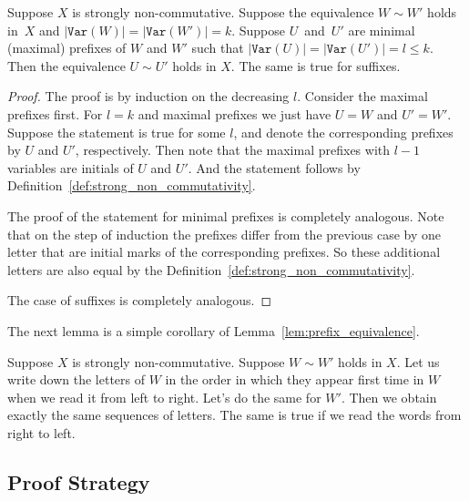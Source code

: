 \documentclass[review,onefignum,onetabnum]{siamart190516}
\newcommand{\var}{\texttt{Var}}
\begin{document}
\begin{lemma} \label{lem:prefix_equivalence}
Suppose $X$ is strongly non-commutative. Suppose the equivalence $W \sim W'$
holds in~$X$ and $|\var(W)|=|\var(W')|=k$. Suppose $U$~and~$U'$ are minimal
(maximal) prefixes of $W$ and $W'$ such that $|\var(U)| = |\var(U')| = l\leq k$.
Then the equivalence $U \sim U'$ holds in $X$. The same is true for suffixes.
\end{lemma}

\begin{proof}
The proof is by induction on the decreasing $l$. Consider the maximal prefixes
first. For $l=k$ and maximal prefixes we just have $U=W$ and $U'=W'$. Suppose
the statement is true for some $l$, and denote the corresponding prefixes by $U$
and $U'$, respectively. Then note that the maximal prefixes with $l-1$ variables
are initials of $U$ and $U'$. And the statement follows by
Definition~\ref{def:strong_non_commutativity}.

The proof of the statement for minimal prefixes is completely analogous. Note
that on the step of induction the prefixes differ from the previous case by one
letter that are initial marks of the corresponding prefixes. So these additional
letters are also equal by the Definition~\ref{def:strong_non_commutativity}.

The case of suffixes is completely analogous.
\end{proof}

The next lemma is a simple corollary of Lemma~\ref{lem:prefix_equivalence}.
\begin{lemma} \label{lem:variables_order}
Suppose $X$ is strongly non-commutative. Suppose $W \sim W'$ holds in $X$. Let us write down the letters of $W$ in the order in which they appear first time in $W$ when we read it from left to right. Let's do the same for $W'$. Then we obtain exactly the same sequences of letters.
%
The same is true if we read the words from right to left.
\end{lemma}

\subsection{Proof Strategy}

\end{document}
